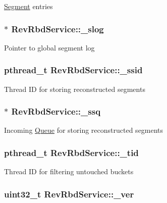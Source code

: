 \hyperlink{structSegment}{\-Segment} entries \hypertarget{structRevRbdService_a9f791b31a7c3d79b24a18fde43073021}{
\subsubsection[{\-\_\-slog}]{$\ast$ {\bf \-Rev\-Rbd\-Service\-::\-\_\-slog}}}\label{structRevRbdService_a9f791b31a7c3d79b24a18fde43073021}
\-Pointer to global segment log \hypertarget{structRevRbdService_a12f3281b79e0f571c9487a3bd6b5e5a1}{
\subsubsection[{\-\_\-ssid}]{\setlength{\rightskip}{0pt plus 5cm}pthread\-\_\-t {\bf \-Rev\-Rbd\-Service\-::\-\_\-ssid}}}\label{structRevRbdService_a12f3281b79e0f571c9487a3bd6b5e5a1}
\-Thread \-I\-D for storing reconstructed segments \hypertarget{structRevRbdService_a292a68eff77497c9fbc1db43d1833354}{
\subsubsection[{\-\_\-ssq}]{$\ast$ {\bf \-Rev\-Rbd\-Service\-::\-\_\-ssq}}}\label{structRevRbdService_a292a68eff77497c9fbc1db43d1833354}
\-Incoming \hyperlink{structQueue}{\-Queue} for storing reconstructed segments \hypertarget{structRevRbdService_a13d86de95b0170261f8f2b71e834cb33}{
\subsubsection[{\-\_\-tid}]{\setlength{\rightskip}{0pt plus 5cm}pthread\-\_\-t {\bf \-Rev\-Rbd\-Service\-::\-\_\-tid}}}\label{structRevRbdService_a13d86de95b0170261f8f2b71e834cb33}
\-Thread \-I\-D for filtering untouched buckets \hypertarget{structRevRbdService_a5f44c03ae393a24c1bf680fea3106e1c}{
\subsubsection[{\-\_\-ver}]{\setlength{\rightskip}{0pt plus 5cm}uint32\-\_\-t {\bf \-Rev\-Rbd\-Service\-::\-\_\-ver}}}\label{structRevRbdService_a5f44c03ae393a24c1bf680fea3106e1c}
